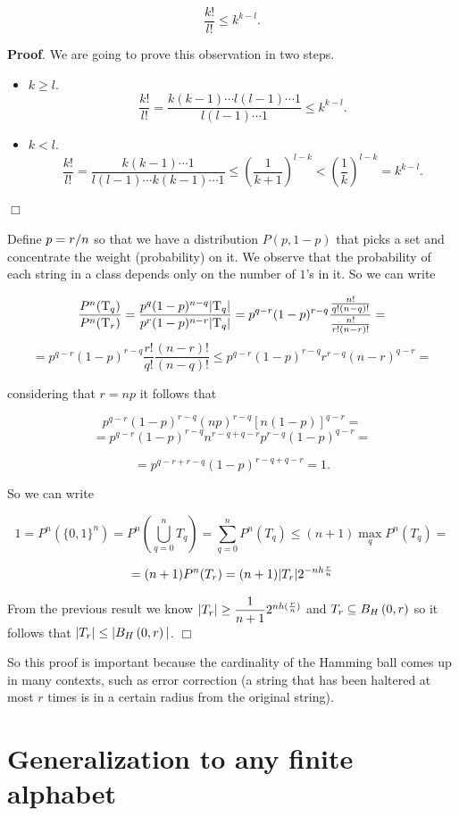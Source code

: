 \begin{obs}
	$$\dfrac{k!}{l!} \leq k^{k-l}.$$
\end{obs}

\noindent\textbf{Proof}. We are going to prove this observation in two steps.
\begin{itemize}
	\item $k \geq l$. 
	$$\dfrac{k!}{l!} = \dfrac{k(k-1) \cdots l(l -1) \cdots 1}{l(l -1) \cdots 1} \leq k^{k-l}.$$
	
	\item $k < l$.
	$$\dfrac{k!}{l!} = \dfrac{k(k-1) \cdots 1}{l(l -1) \cdots k(k-1) \cdots 1} \leq \left(\dfrac{1}{k+1}\right)^{l-k} < \left(\dfrac{1}{k}\right)^{l-k} = k^{k-l}.$$
\end{itemize}
\hfill$\Box$

Define $p = {r}/{n}$  so that we have a distribution $P(p, 1-p)$ that picks a set and concentrate the weight (probability) on it. We observe that the probability of each string in a class depends only on the number of $1$'s in it. So we can write

\[\dfrac{P^n(\mathrm{T}_q)}{P^n(\mathrm{T}_r)} = \dfrac{p^q(1-p)^{n-q}|\mathrm{T}_q|}{p^r(1-p)^{n-r}|\mathrm{T}_q|} = p^{q-r}(1-p)^{r-q} \dfrac{\frac{n!}{q!(n-q)!}}{\frac{n!}{r!(n-r)!}} = \]
\[ = p^{q-r}(1-p)^{r-q}\dfrac{r!}{q!}\dfrac{(n-r)!}{(n-q)!} \leq p^{q-r}(1-p)^{r-q}r^{r-q}(n-r)^{q-r} = \]

considering that $r = np$ it follows that

\[p^{q-r}(1-p)^{r-q} (np)^{r-q}[n(1-p)]^{q-r}= \] \[ = p^{q-r}(1-p)^{r-q}n^{r-q+q-r}p^{r-q}(1-p)^{q-r} = \]

\[ = p^{q-r + r-q}(1-p)^{r-q+q-r} = 1.\]

So we can write

\[1 = P^n(\{0,1\}^n) = P^n\left(\bigcup_{q=0}^nT_q\right) = \sum_{q=0}^nP^n(T_q)\leq(n+1) \max_qP^n(T_q) = \]

\[=(n+1)P^n(T_r) = (n + 1)|T_r|2^{-nh\frac{r}{n}}\]

From the previous result we know $|T_r| \geq \dfrac{1}{n+1}2^{nh(\frac{r}{n})}$ and $T_r \subseteq B_H\left(0, r\right)$ so it follows that $|T_r| \leq |B_H\left(0, r\right)|$. \hfill $\Box$

So this proof is important because the cardinality of the Hamming ball comes up in many contexts, such as error correction (a string that has been haltered at most $r$ times is in a certain radius from the original string).

\section{Generalization to any finite alphabet}

